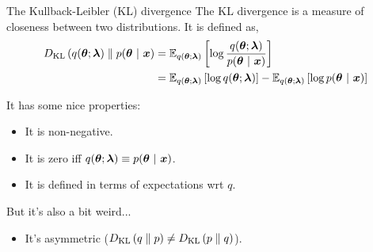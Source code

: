 \documentclass[aspectratio=169]{beamer}
\begin{document}
\begin{frame}{The Kullback-Leibler (KL) divergence}
The KL divergence is a measure of closeness between two distributions. It is defined as,
\begin{align}
    D_{\textrm{KL}}\left(q(\boldsymbol{\theta}; \boldsymbol{\lambda})\;\|\;p(\boldsymbol{\theta} ~\vert~ \boldsymbol{x}\right) &= \mathbb{E}_{q(\boldsymbol{\theta}; \boldsymbol{\lambda})} \left[ \log \frac{q(\boldsymbol{\theta}; \boldsymbol{\lambda})}{p(\boldsymbol{\theta} ~\vert~ \boldsymbol{x})} \right] \\
    &= \mathbb{E}_{q(\boldsymbol{\theta}; \boldsymbol{\lambda})} \left[ \log q(\boldsymbol{\theta}; \boldsymbol{\lambda}) \right] 
    - \mathbb{E}_{q(\boldsymbol{\theta}; \boldsymbol{\lambda})} \left[ \log p(\boldsymbol{\theta} ~\vert~ \boldsymbol{x}) \right] 
\end{align}

It has some nice properties:
\begin{itemize}
    \item It is non-negative.
    
    \item It is zero iff $q(\boldsymbol{\theta}; \boldsymbol{\lambda}) \equiv p(\boldsymbol{\theta} ~\vert~ \boldsymbol{x})$.
    
    \item It is defined in terms of expectations wrt $q$.
\end{itemize}

But it's also a bit weird... 
\begin{itemize}
    \item It's asymmetric ($D_{\textrm{KL}}\left(q\;\|\;p\right) \neq D_{\textrm{KL}}\left(p\;\|\;q\right)$).
\end{itemize}
\end{frame}
\end{document}
